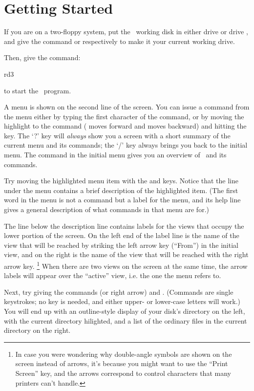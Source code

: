 \section{Getting Started}

If you are on a two-floppy system, put the \RD\ working disk in either drive
 or drive , and give the command  or
 respectively to make it your current working
drive. 

Then, give the command:
\begin{dcode}
rd3
\end{dcode}
\noindent
to start the \RD\ program. 
 
A menu is shown on the second line of the screen.  You can issue a
command from the menu either by typing the first character of the
command, or by moving the highlight to the command ( moves
forward and  moves backward) and hitting the 
key.  The `?' key will {\em always} show you a screen with a
short summary of the current menu and its commands; the `/' key
always brings you back to the initial menu.  The 
command in the initial menu gives you an overview of \RD\ and its
commands.
 
Try moving the highlighted menu item with the  and
 keys.  Notice that the line under the menu contains a
brief description of the highlighted item.  (The first word in the
menu is not a command but a label for the menu, and its help line
gives a general description of what commands in that menu are for.)

The line below the description line contains labels for the views
that occupy the lower portion of the screen.  On the left end of the
label line is the name of the view that will be reached by striking
the left arrow key (``From'') in the initial view, and on the right is
the name of the view that will be reached with the right arrow key.%
\footnote{In case you were wondering why double-angle symbols are
shown on the screen instead of arrows, it's because you might want to
use the ``Print Screen'' key, and the arrows correspond to control
characters that many printers can't handle.}  When there are two
views on the screen at the same time, the arrow labels will appear
over the ``active'' view, i.e. the one the menu refers to.

Next, try giving the commands  (or right arrow) and
.  (Commands are single key\-strokes; no 
key is needed, and either upper- or lower-case letters will work.)
You will end up with an outline-style display of your disk's directory
on the left, with the current directory hilighted, and a list of the
ordinary files in the current directory on the right.
 
